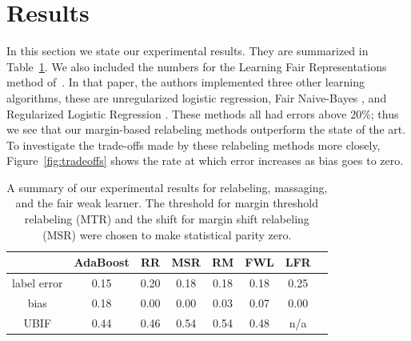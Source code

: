 \documentclass{article}
\begin{document}
\section{Results} \label{sec:results}

In this section we state our experimental results. They are summarized in
Table~\ref{table:results}. We also included the numbers for the Learning Fair
Representations method of~\citet{ZemelWSPD13}. In that paper, the authors
implemented three other learning algorithms, these are unregularized logistic
regression, Fair Naive-Bayes \citep{KamiranC09}, and Regularized Logistic
Regression \citep{KamashimaAS11}. These methods all had errors above $20\%$;
thus we see that our margin-based relabeling methods outperform the state of
the art.  To investigate the trade-offs made by these relabeling methods more
closely, Figure~\ref{fig:tradeoffs} shows the rate at which error increases as bias goes to zero.

\begin{table}
\centering
\begin{tabular}{| c | ccccccc |}
\hline
               & AdaBoost & RR   %
               & MSR  & RM   & FWL  & LFR \cite{ZemelWSPD13} \\
\hline 
label error    & 0.15     & 0.20 %
& 0.18 & 0.18 & 0.18 & 0.25 \\ 
bias           & 0.18     & 0.00 %
& 0.00 & 0.03 & 0.07 & 0.00 \\ 
UBIF           & 0.44     & 0.46   & 0.54 
& 0.54 & 0.48  & n/a \\ 
\hline 
\hline 
\end{tabular}
\caption{A summary of our experimental results for relabeling, massaging, and
the fair weak learner. The threshold for margin threshold relabeling (MTR) and
the shift for margin shift relabeling (MSR) were chosen to make statistical
parity zero.}
\label{table:results}
\end{table}
\end{document}
